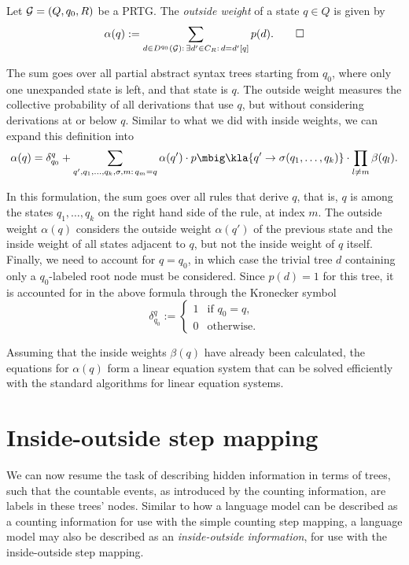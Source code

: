 \begin{definition}
 Let $\mathcal G = (Q,q_0,R)$ be a PRTG. The \emph{outside weight} of a state $q\in Q$ is given by
 \[
  \alpha(q) := \sum_{d\in D^{q_0}(\mathcal G):\, \exists d'\in C_R:\, d = d'[q]} p(d).
  \qedhere
 \]
\end{definition}

The sum goes over all partial abstract syntax trees starting from $q_0$, where
only one unexpanded state is left, and that state is $q$. The outside weight
measures the collective probability of all derivations that use $q$, but
without considering derivations at or below $q$. Similar to what we did with
inside weights, we can expand this definition into
\begin{equation}\label{eq:02-alpha}
 \alpha(q) = \delta_{q_0}^q + \sum_{q',q_1,\ldots,q_k,\sigma,m:\,q_m=q} \alpha(q') \cdot p\mbig\kla{q'\to\sigma(q_1,\ldots,q_k)} \cdot \prod_{l\neq m} \beta(q_l).
\end{equation}

In this formulation, the sum goes over all rules that derive $q$, that is, $q$
is among the states $q_1,\ldots,q_k$ on the right hand side of the rule, at
index $m$. The outside weight $\alpha(q)$ considers the outside weight
$\alpha(q')$ of the previous state and the inside weight of all states adjacent
to $q$, but not the inside weight of $q$ itself.
Finally, we need to account for $q=q_0$, in which case the trivial tree $d$
containing only a $q_0$-labeled root node must be considered. Since $p(d)=1$
for this tree, it is accounted for in the above formula through the Kronecker
symbol
\[
 \delta_{q_0}^q := \begin{cases}
  1 & \text{if } q_0 = q, \\
  0 & \text{otherwise}.
 \end{cases}
\]

Assuming that the inside weights $\beta(q)$ have already been calculated, the
equations for $\alpha(q)$ form a linear equation system that can be solved
efficiently with the standard algorithms for linear equation systems.

\section{Inside-outside step mapping}

We can now resume the task of describing hidden information in terms of trees,
such that the countable events, as introduced by the counting information, are
labels in these trees' nodes. Similar to how a language model can be described
as a counting information for use with the simple counting step mapping, a
language model may also be described as an \emph{inside-outside information},
for use with the inside-outside step mapping.

